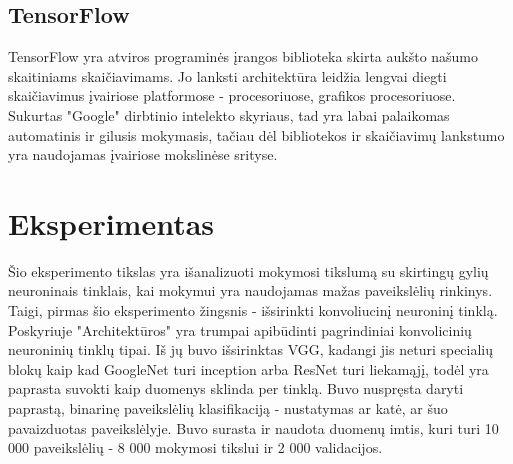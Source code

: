 \documentclass{VUMIFPSkursinis}
\begin{document}
\subsection{TensorFlow}
TensorFlow yra atviros programinės įrangos biblioteka skirta aukšto našumo skaitiniams skaičiavimams. Jo lanksti architektūra leidžia lengvai diegti skaičiavimus įvairiose 
platformose - procesoriuose, grafikos procesoriuose. Sukurtas "Google" dirbtinio intelekto skyriaus, tad yra labai palaikomas automatinis ir gilusis mokymasis, tačiau 
dėl bibliotekos ir skaičiavimų lankstumo yra naudojamas įvairiose mokslinėse srityse.

\section{Eksperimentas}
Šio eksperimento tikslas yra išanalizuoti mokymosi tikslumą su skirtingų gylių neuroninais tinklais, kai mokymui yra naudojamas mažas paveikslėlių rinkinys. Taigi, pirmas 
šio eksperimento žingsnis - išsirinkti konvoliucinį neuroninį tinklą. Poskyriuje "Architektūros" yra trumpai apibūdinti pagrindiniai konvolicinių neuroninių tinklų tipai. 
Iš jų buvo išsirinktas VGG, kadangi jis neturi specialių blokų kaip kad GoogleNet turi inception arba ResNet turi liekamąjį, todėl yra paprasta suvokti kaip duomenys sklinda per tinklą. Buvo nuspręsta daryti paprastą, binarinę paveikslėlių 
klasifikaciją - nustatymas ar katė, ar šuo pavaizduotas paveikslėlyje. Buvo surasta ir naudota duomenų imtis, kuri turi 10 000 paveikslėlių - 8 000 mokymosi tikslui ir 2 000 validacijos.

\end{document}

